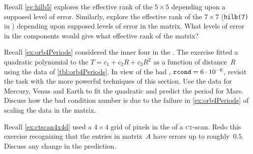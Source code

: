 \begin{exercise} \label{ex:hilb7} 
Recall \cref{eg:hilb5} explores the effective rank of the \(5\times5\)  depending upon a supposed level of error.
Similarly, explore the effective rank of the \(7\times7\)  (\verb|hilb(7)| in \script) depending upon supposed levels of error in the matrix.
What levels of error in the components would give what effective rank of the matrix?
\end{exercise}









\begin{exercise} \label{ex:orb4Periods2} 
Recall \cref{ex:orb4Periods} considered the inner four  in the .
The exercise fitted a quadratic polynomial to the  \(T=c_1+c_2R+c_3R^2\) as a function of distance~\(R\) using the data of \cref{tbl:orb4Periods}.
In view of the bad , \(\verb|rcond|=6\cdot10^{-6}\), revisit the task with the more powerful techniques of this section.
Use the data for Mercury, Venus and Earth to fit the quadratic and predict the period for Mars.
Discuss how the bad condition number is due to the failure in \cref{ex:orb4Periods} of scaling the data in the matrix.
\end{exercise}



\begin{exercise}  
\label{ex:ex:ctscan4x4dx}
Recall \cref{ex:ctscan4x4d} used a \(4\times4\) grid of pixels in the  of a \textsc{ct}-scan.
Redo this exercise recognizing that the entries in matrix~\(A\) have errors up to roughly~\(0.5\).
Discuss any change in the prediction.
\end{exercise}




